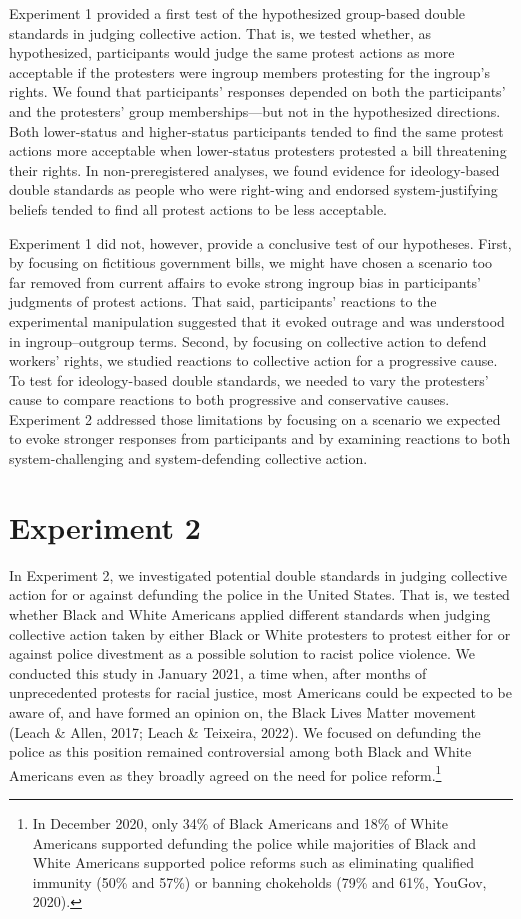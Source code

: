 \documentclass[12pt, letterpaper]{article}
\begin{document}
Experiment 1 provided a first test of the hypothesized group-based
double standards in judging collective action. That is, we tested
whether, as hypothesized, participants would judge the same protest
actions as more acceptable if the protesters were ingroup members
protesting for the ingroup's rights. We found that participants'
responses depended on both the participants' and the protesters' group
memberships---but not in the hypothesized directions. Both lower-status
and higher-status participants tended to find the same protest actions
more acceptable when lower-status protesters protested a bill
threatening their rights. In non-preregistered analyses, we found
evidence for ideology-based double standards as people who were
right-wing and endorsed system-justifying beliefs tended to find all
protest actions to be less acceptable.

Experiment 1 did not, however, provide a conclusive test of our
hypotheses. First, by focusing on fictitious government bills, we might
have chosen a scenario too far removed from current affairs to evoke
strong ingroup bias in participants' judgments of protest actions. That
said, participants' reactions to the experimental manipulation suggested
that it evoked outrage and was understood in ingroup--outgroup terms.
Second, by focusing on collective action to defend workers' rights, we
studied reactions to collective action for a progressive cause. To test
for ideology-based double standards, we needed to vary the protesters'
cause to compare reactions to both progressive and conservative causes.
Experiment 2 addressed those limitations by focusing on a scenario we
expected to evoke stronger responses from participants and by examining
reactions to both system-challenging and system-defending collective
action.

\hypertarget{experiment-2}{%
\section{Experiment 2}\label{experiment-2}}

In Experiment 2, we investigated potential double standards in judging
collective action for or against defunding the police in the United
States. That is, we tested whether Black and White Americans applied
different standards when judging collective action taken by either Black
or White protesters to protest either for or against police divestment
as a possible solution to racist police violence. We conducted this
study in January 2021, a time when, after months of unprecedented
protests for racial justice, most Americans could be expected to be
aware of, and have formed an opinion on, the Black Lives Matter movement
(Leach \& Allen, 2017; Leach \& Teixeira, 2022). We focused on defunding
the police as this position remained controversial among both Black and
White Americans even as they broadly agreed on the need for police
reform.\footnote{In December 2020, only 34\% of Black Americans and 18\%
  of White Americans supported defunding the police while majorities of
  Black and White Americans supported police reforms such as eliminating
  qualified immunity (50\% and 57\%) or banning chokeholds (79\% and
  61\%, YouGov, 2020).}
\end{document}
